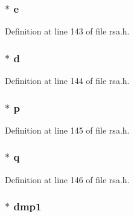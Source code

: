 \subsubsection[{\texorpdfstring{e}{e}}]{ $\ast$ e}\hypertarget{structrsa__st_a32feda51fa6cc1ffd56732674205b279}{}\label{structrsa__st_a32feda51fa6cc1ffd56732674205b279}


Definition at line 143 of file rsa.\+h.

\subsubsection[{\texorpdfstring{d}{d}}]{ $\ast$ d}\hypertarget{structrsa__st_ac1b88e7c7683553594a92766f78462ef}{}\label{structrsa__st_ac1b88e7c7683553594a92766f78462ef}


Definition at line 144 of file rsa.\+h.

\subsubsection[{\texorpdfstring{p}{p}}]{ $\ast$ p}\hypertarget{structrsa__st_ab39230b0a53cb4326ae76467247959c3}{}\label{structrsa__st_ab39230b0a53cb4326ae76467247959c3}


Definition at line 145 of file rsa.\+h.

\subsubsection[{\texorpdfstring{q}{q}}]{ $\ast$ q}\hypertarget{structrsa__st_aa8aedc93a12df9d36c9fe616c2b6486a}{}\label{structrsa__st_aa8aedc93a12df9d36c9fe616c2b6486a}


Definition at line 146 of file rsa.\+h.

\subsubsection[{\texorpdfstring{dmp1}{dmp1}}]{ $\ast$ dmp1}\hypertarget{structrsa__st_af0afe0a0929dbc04a09db5f23880d908}{}\label{structrsa__st_af0afe0a0929dbc04a09db5f23880d908}


